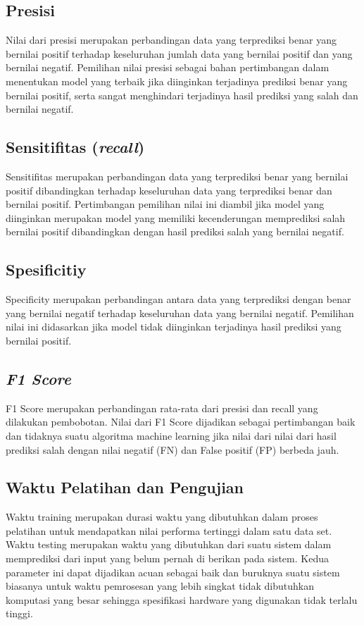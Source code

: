 \subsection{Presisi}
Nilai dari presisi merupakan perbandingan data yang terprediksi benar yang 
bernilai positif terhadap keseluruhan jumlah data yang bernilai positif dan 
yang bernilai negatif. Pemilihan nilai presisi sebagai bahan pertimbangan 
dalam 
menentukan model yang terbaik jika diinginkan terjadinya prediksi benar yang 
bernilai positif, serta sangat menghindari terjadinya hasil prediksi yang 
salah 
dan bernilai negatif. 

\subsection{Sensitifitas (\textit{recall})}
Sensitifitas merupakan perbandingan data yang terprediksi benar yang bernilai 
positif dibandingkan terhadap keseluruhan data yang terprediksi benar dan 
bernilai positif. Pertimbangan pemilihan nilai ini diambil jika model yang 
diinginkan merupakan model yang memiliki kecenderungan memprediksi salah 
bernilai positif dibandingkan dengan hasil prediksi salah yang bernilai 
negatif.

\subsection{Spesificitiy}
Specificity merupakan perbandingan antara data yang terprediksi dengan benar 
yang bernilai negatif terhadap keseluruhan data yang bernilai negatif. 
Pemilihan nilai ini didasarkan jika model tidak diinginkan terjadinya hasil 
prediksi yang bernilai positif.

\subsection{\textit{F1 Score}}
F1 Score merupakan perbandingan rata-rata dari presisi dan recall yang dilakukan pembobotan. Nilai dari F1 Score dijadikan sebagai pertimbangan baik dan tidaknya suatu algoritma machine learning jika nilai dari nilai dari hasil prediksi salah dengan nilai negatif (FN) dan False positif (FP) berbeda jauh.

\subsection{Waktu Pelatihan dan Pengujian}
Waktu training merupakan durasi waktu yang dibutuhkan dalam proses pelatihan untuk mendapatkan nilai performa tertinggi dalam satu data set. Waktu testing merupakan waktu yang dibutuhkan dari suatu sistem dalam memprediksi dari input yang belum pernah di berikan pada sistem. Kedua parameter ini dapat dijadikan acuan sebagai baik dan buruknya suatu sistem biasanya untuk waktu pemrosesan  yang lebih singkat tidak dibutuhkan komputasi yang besar sehingga spesifikasi hardware yang digunakan tidak terlalu tinggi.

